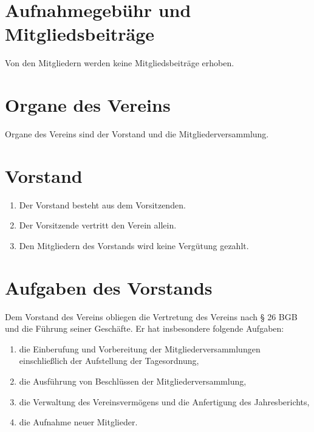 \section{Aufnahmegebühr und Mitgliedsbeiträge}
Von den Mitgliedern werden keine Mitgliedsbeiträge erhoben.

\section{Organe des Vereins}
Organe des Vereins sind der Vorstand und die Mitgliederversammlung.

\section{Vorstand}
\begin{enumerate}[label=(\arabic*)]
    \item Der Vorstand besteht aus dem Vorsitzenden.
    \item Der Vorsitzende vertritt den Verein allein.
    \item Den Mitgliedern des Vorstands wird keine Vergütung gezahlt.
\end{enumerate}

\section{Aufgaben des Vorstands}
Dem Vorstand des Vereins obliegen die Vertretung des Vereins nach § 26 BGB und
die Führung seiner Geschäfte. Er hat insbesondere folgende Aufgaben:
\begin{enumerate}[label=\alph*)]
    \item die Einberufung und Vorbereitung der Mitgliederversammlungen
        einschließlich der Aufstellung der Tagesordnung,
    \item die Ausführung von Beschlüssen der Mitgliederversammlung,
    \item die Verwaltung des Vereinsvermögens und die Anfertigung des Jahresberichts,
    \item die Aufnahme neuer Mitglieder.
\end{enumerate}

